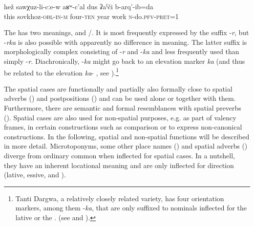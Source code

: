 \begin{exe}
	\ex	\label{ex:In the sovkhoz I worked for 40 years}
	\gll	hež	sawχuz-li-cːe-w	aʁʷ-c'al	dus	ʡaˁči	b-arq'-ib=da \\
		this	sovkhoz-\textsc{obl}-\textsc{in}-\textsc{m}	four-\textsc{ten}	year	work	\textsc{n}-do.\textsc{pfv}-\textsc{pret}=1\\
	\glt	{}
\end{exe} 

The  has two meanings,  and \slash{}. It is most frequently expressed by the suffix -\textit{r}, but -\textit{rka} is also possible with apparently no difference in meaning. The latter suffix is morphologically complex consisting of -\textit{r} and -\textit{ka} and less frequently used than simply -\textit{r}. Diachronically, -\textit{ka} might go back to an elevation marker \textit{ka}  (and thus be related to the elevation  \textit{ka}- , see ).\footnote{Tanti Dargwa, a relatively closely related variety, has four orientation markers, among them -\textit{ka}, that are only suffixed to nominals inflected for the lative or the . (see \citealp[69]{Sumbatova.Lander2014} and \citealp{ForkerLTSanzhi}).} 

The spatial cases are functionally and partially also formally close to spatial adverbs () and postpositions () and can be used alone or together with them. Furthermore, there are semantic and formal resemblances with spatial preverbs (). Spatial cases are also used for non-spatial purposes, e.g. as part of valency frames, in certain constructions such as comparison or to express non-canonical  constructions. In the following, spatial and non-spatial functions will be described in more detail. Microtoponyms, some other place names () and spatial adverbs () diverge from ordinary common  when inflected for spatial cases. In a nutshell, they have an inherent locational meaning and are only inflected for direction (lative, essive, and ).



